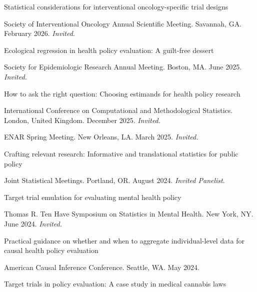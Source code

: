 \documentclass[letterpaper,11pt]{article} %
\begin{document}
	\begin{etaremune}
        \item Statistical considerations for interventional oncology-specific trial designs
        \begin{conflist}
            \item Society of Interventional Oncology Annual Scientific Meeting. Savannah, GA. February 2026. \textit{Invited}.
        \end{conflist}
		\item Ecological regression in health policy evaluation: A guilt-free dessert
		\begin{conflist}
			\item Society for Epidemiologic Research Annual Meeting. Boston, MA. June 2025. \textit{Invited.}
		\end{conflist}
		\item How to ask the right question: Choosing estimands for health policy research
		\begin{conflist}
			\item International Conference on Computational and Methodological Statistics. London, United Kingdom. December 2025. \textit{Invited.}
			\item ENAR Spring Meeting. New Orleans, LA. March 2025. \textit{Invited.}
		\end{conflist}
		\item Crafting relevant research: Informative and translational statistics for public policy
		\begin{conflist}
			\item Joint Statistical Meetings. Portland, OR. August 2024. \textit{Invited Panelist}.
		\end{conflist}
		\item Target trial emulation for evaluating mental health policy
		\begin{conflist}
			\item Thomas R. Ten Have Symposium on Statistics in Mental Health. New York, NY. June 2024. \textit{Invited.}
		\end{conflist}
		\item Practical guidance on whether and when to aggregate individual-level data for causal health policy evaluation
		\begin{conflist}
			\item American Causal Inference Conference. Seattle, WA. May 2024.
		\end{conflist}
		\item Target trials in policy evaluation: A case study in medical cannabis laws

\end{etaremune}
\end{document}
